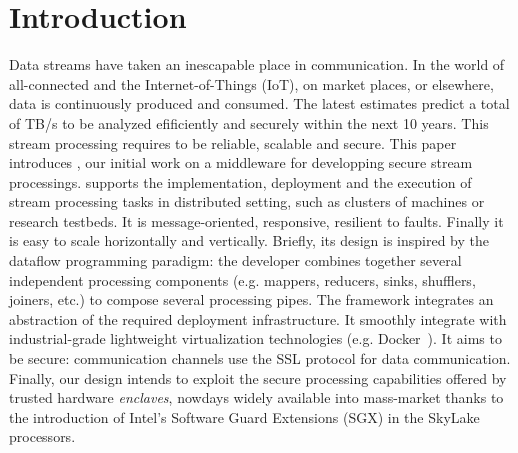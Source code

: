 \section{Introduction}
\label{sec:introduction}


Data streams have taken an inescapable place in communication.
In the world of all-connected and the Internet-of-Things (IoT), on market places, or elsewhere, data is continuously produced and consumed. 
The latest estimates predict a total of  TB/s to be analyzed efificiently and securely within the next 10 years.
This stream processing requires to be reliable, scalable and secure.
This paper introduces \SYS, our initial work on a middleware for developping secure stream processings. 
\SYS supports the implementation, deployment and the execution of stream processing tasks in distributed setting, such as clusters of machines or research testbeds.
It is message-oriented, responsive, resilient to faults.
Finally it is easy to scale horizontally and vertically\cite{reactivemanifesto}.
Briefly, its design is inspired by the dataflow programming paradigm: the developer combines together several independent processing components (e.g. mappers, reducers, sinks, shufflers, joiners, etc.) to compose several processing pipes.%
The framework integrates an abstraction of the required deployment infrastructure.
It smoothly integrate with industrial-grade lightweight virtualization technologies (e.g. Docker~\cite{}).%
It aims to be secure: communication channels use the SSL protocol for data communication.
Finally, our design intends to exploit the secure processing capabilities offered by trusted hardware \emph{enclaves}, nowdays widely available into mass-market thanks to the introduction of Intel's Software Guard Extensions (SGX) in the SkyLake processors.

